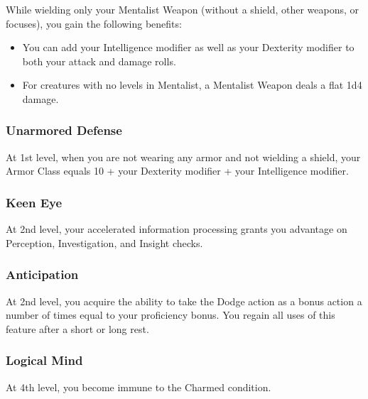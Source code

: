 While wielding only your Mentalist Weapon (without a shield, other weapons, or focuses), you gain the following benefits:
\begin{itemize}
    \item You can add your Intelligence modifier as well as your Dexterity modifier to both your attack and damage rolls.
    \item For creatures with no levels in Mentalist, a Mentalist Weapon deals a flat 1d4 damage.
\end{itemize}
\subsubsection{Unarmored Defense}
At 1st level, when you are not wearing any armor and not wielding a shield, your Armor Class equals 10 + your Dexterity modifier + your Intelligence modifier.
\subsubsection{Keen Eye} 
At 2nd level, your accelerated information processing grants you advantage on Perception, Investigation, and Insight checks.
\subsubsection{Anticipation} 
At 2nd level, you acquire the ability to take the Dodge action as a bonus action a number of times equal to your proficiency bonus. You regain all uses of this feature after a short or long rest.
\subsubsection{Logical Mind} 
At 4th level, you become immune to the Charmed condition.

